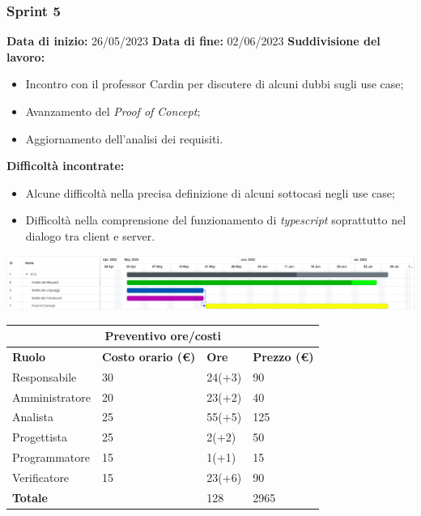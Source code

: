 \documentclass[a4paper, 12pt]{article}
\begin{document}
\subsubsection{Sprint 5}
\textbf{Data di inizio:} 26/05/2023\newline
\textbf{Data di fine:} 02/06/2023\newline
\newline
\textbf{Suddivisione del lavoro:}
\begin{itemize}
	\item Incontro con il professor Cardin per discutere di alcuni dubbi sugli use case;
	\item Avanzamento del \textit{Proof of Concept};
	\item Aggiornamento dell'analisi dei requisiti.
\end{itemize}
\textbf{Difficoltà incontrate:}
\begin{itemize}
	\item Alcune difficoltà nella precisa definizione di alcuni sottocasi negli use case;
	\item Difficoltà nella comprensione del funzionamento di \textit{typescript} soprattutto nel dialogo tra client e server.
\end{itemize}
\includegraphics[scale=0.24]{RTB_4.png}\newline
\newline

\begin{center}
	\begin{tabularx}{\textwidth}{|X|X|X|X|}
		\hline
		\multicolumn{4}{|c|}{\textbf{Preventivo ore/costi}}                                      \\
		\hline
		\hline
		\textbf{Ruolo}  & \textbf{Costo orario (\euro)} & \textbf{Ore} & \textbf{Prezzo (\euro)} \\
		\hline
		Responsabile    & 30                            & 24(+3)       & 90                      \\
		\hline
		Amministratore  & 20                            & 23(+2)       & 40                      \\
		\hline
		Analista        & 25                            & 55(+5)       & 125                     \\
		\hline
		Progettista     & 25                            & 2(+2)        & 50                      \\
		\hline
		Programmatore   & 15                            & 1(+1)        & 15                      \\
		\hline
		Verificatore    & 15                            & 23(+6)       & 90                      \\
		\hline
		\hline
		\textbf{Totale} &                               & 128          & 2965                    \\
		\hline
	\end{tabularx}\\[8pt]
	\mbox{}\\
\end{center}
\end{document}

